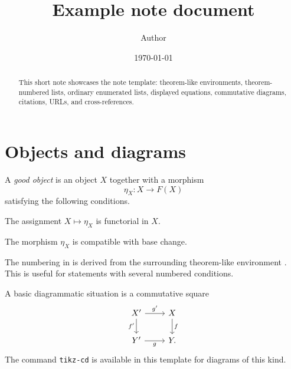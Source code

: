 \documentclass[12pt,a4paper]{amsart}
\title[Example note]{Example note document}
\author[Author]{Author}
\date{\today}
\begin{document}
\maketitle

\begin{abstract}
This short note showcases the note template: theorem-like environments,
theorem-numbered lists, ordinary enumerated lists, displayed equations,
commutative diagrams, citations, URLs, and cross-references.
\end{abstract}

\tableofcontents

\section{Objects and diagrams}

\begin{definition}
  \label{definition:good-object}
  A \emph{good object} is an object \(X\) together with a morphism
  \[
    \eta_X \colon X \to F(X)
  \]
  satisfying the following conditions.
  \begin{theoremitems}
    \item The assignment \(X \mapsto \eta_X\) is functorial in \(X\).
      \label{item:good-functoriality} 
    \item The morphism \(\eta_X\) is compatible with base change.
      \label{item:good-compatibility} 
  \end{theoremitems}
\end{definition}

The numbering in  is
derived from the surrounding theorem-like environment
. This is useful for statements with several
numbered conditions.


\begin{example}
  \label{example:diagram}
  A basic diagrammatic situation is a commutative square
  \[
  \begin{tikzcd}
    X' \arrow[r, "g'"] \arrow[d, "f'"'] & X \arrow[d, "f"] \\
    Y' \arrow[r, "g"']                  & Y .
  \end{tikzcd}
  \]
  The command \texttt{tikz-cd} is available in this template for diagrams of this
  kind.
\end{example}

\end{document}
